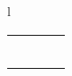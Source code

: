 \begin{center}
\begin{tabular}{l}
{\begin{tabular}{llrr}
				                &                                &                                                                                                                                                          &                                                                                                                                                          \\
				\bo{Anggota 1}  & \bo{:} \bo{\pembimbingkedua}   & \underline{\space \space \space\space \space \space\space \space \space\space \space \space\space \space \space\space \space \space\space \space \space} &                                                                                                                                                          \\
				                &                                &                                                                                                                                                          &                                                                                                                                                          \\
				\bo{Anggota 2}  & \bo{:} \bo{\pengujipertama}    &                                                                                                                                                          & \underline{\space \space \space\space \space \space\space \space \space\space \space \space\space \space \space\space \space \space\space \space \space} \\
				                &                                &                                                                                                                                                          &                                                                                                                                                          \\
				\bo{Anggota 3}  & \bo{:} \bo{\pembimbingkedua}   & \underline{\space \space \space\space \space \space\space \space \space\space \space \space\space \space \space\space \space \space\space \space \space} &
			\end{tabular}
		}
	\end{tabular}

\end{center}